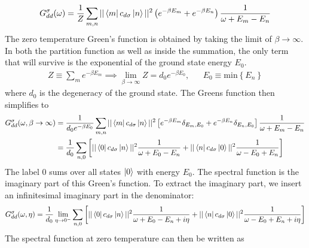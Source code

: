 \documentclass[twoside,11pt]{report}
\numberwithin{equation}{section}
\begin{document}
\begin{equation}\begin{aligned}
	G_{d d}^\sigma(\omega) = \frac{1}{Z}\sum_{m,n}||\bra{m}c_{d\sigma}\ket{n}||^2\left( e^{-\beta E_m} + e^{-\beta E_n}\right)\frac{1}{\omega + E_m - E_n}
\end{aligned}\end{equation}
The zero temperature Green's function is obtained by taking the limit of \(\beta \to \infty\). In both the partition function as well as inside the summation, the only term that will survive is the exponential of the ground state energy \(E_0\).
\begin{equation*}\begin{aligned}
	Z \equiv \sum_m e^{-\beta E_m} \implies \lim_{\beta \to \infty}Z = d_0 e^{-\beta E_0}, && E_0 \equiv \text{min}\left\{ E_n \right\} 
\end{aligned}\end{equation*}
where \(d_0\) is the degeneracy of the ground state. The Greens function then simplifies to
\begin{equation}\begin{aligned}
	G_{d d}^\sigma(\omega, \beta \to \infty) &= \frac{1}{d_0e^{-\beta E_0}}\sum_{m,n}||\bra{m}c_{d\sigma}\ket{n}||^2\left[e^{-\beta E_m}\delta_{E_m, E_0} + e^{-\beta E_n}\delta_{E_n, E_0}\right]\frac{1}{\omega + E_m - E_n}\\
						 &= \frac{1}{d_0}\sum_{n,0}\left[||\bra{0}c_{d\sigma}\ket{n}||^2\frac{1}{\omega + E_0 - E_n} + ||\bra{n}c_{d\sigma}\ket{0}||^2\frac{1}{\omega - E_0 + E_n}\right]\\
\end{aligned}\end{equation}
The label 0 sums over all states \(\ket{0}\) with energy \(E_0\). The spectral function is the imaginary part of this Green's function. To extract the imaginary part, we insert an infinitesimal imaginary part in the denominator:
\begin{equation}\begin{aligned}
	G_{d d}^\sigma(\omega, \eta) = \frac{1}{d_0}\lim_{\eta \to 0^-}\sum_{n,0}\left[||\bra{0}c_{d\sigma}\ket{n}||^2\frac{1}{\omega + E_0 - E_n + i\eta} + ||\bra{n}c_{d\sigma}\ket{0}||^2\frac{1}{\omega - E_0 + E_n + i\eta}\right]\\
\end{aligned}\end{equation}
The spectral function at zero temperature can then be written as
\end{document}
